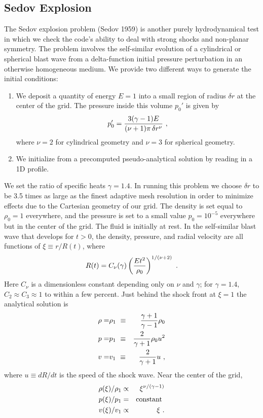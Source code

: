 \subsection{Sedov Explosion}
\label{Sec:SimulationSedov}

The Sedov explosion problem (Sedov 1959) is another purely hydrodynamical
test in which we check the code's ability to deal with strong shocks
and non-planar symmetry. The problem involves the self-similar evolution
of a cylindrical or
spherical blast wave from a delta-function initial pressure perturbation
in an otherwise homogeneous medium. 
We provide two different ways to generate the initial conditions:
\begin{enumerate}
\item
We deposit a quantity of energy $E=1$ into a
small region of radius $\delta r$ at the center of the grid.
The pressure inside this volume $p_0'$ is given by
\begin{equation}
p_0' = {3(\gamma-1)E\over(\nu+1)\pi\,\delta r^\nu}\ ,
\end{equation}
\noindent where $\nu=2$ for cylindrical geometry and $\nu=3$ for spherical
geometry. 
\item
We initialize from a precomputed pseudo-analytical solution by reading
in a 1D profile.
\end{enumerate}

We set the ratio of specific heats $\gamma=1.4$.
In running this problem we choose $\delta r$ to be 3.5
times as large as the finest adaptive mesh resolution in order to minimize
effects due to the Cartesian geometry of our grid.
The density
is set equal to $\rho_0=1$ everywhere, and the
pressure is set to a small value $p_0=10^{-5}$ everywhere but in the center
of the grid.
The fluid is initially at rest.
In the self-similar blast wave that develops for $t>0$, the
density, pressure, and radial velocity are all functions of
$\xi \equiv r/R(t)$, where
\begin{equation}
R(t) = C_\nu(\gamma) \left({Et^2\over \rho_0}\right)^{1/(\nu+2)}\ .
\end{equation}
\noindent Here $C_\nu$ is a
dimensionless constant depending only on $\nu$ and $\gamma$; for
$\gamma=1.4$, $C_2 \approx C_3 \approx 1$ to within a few percent.
Just behind the shock front at $\xi = 1$ the analytical solution is
\begin{eqnarray}
\nonumber
\rho = & \rho_1\,\, \equiv & {\gamma+1\over\gamma-1}\rho_0 \\
p    = & p_1\,\,    \equiv & {2\over\gamma+1}\rho_0 u^2 \\
\nonumber
v    = & v_1\,\,    \equiv & {2\over\gamma+1}u\ ,
\end{eqnarray}
\noindent where $u \equiv dR/dt$ is the speed of the shock wave. Near the
center of the grid,
\begin{eqnarray}
\nonumber
\rho(\xi)/\rho_1 & \propto & \xi^{\nu/(\gamma-1)} \\
p(\xi)/p_1       & =       & {\rm constant}\ \\
\nonumber
v(\xi)/v_1       & \propto & \xi \ .
\end{eqnarray}

